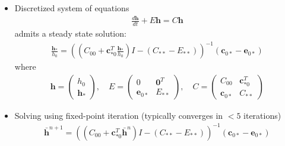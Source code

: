 \documentclass[mathserif, aspectratio=169]{beamer}
\newcommand{\vect}[1]{\boldsymbol{#1}}
\begin{document}
\begin{frame}
\begin{itemize}
\item Discretized system of equations 
\begin{align*}
\frac{d \vect{h}}{dt} + E \vect{h} = C \vect{h}
\end{align*}
admits a steady state solution:
\begin{align*}
\frac{\vect{h}_\ast}{h_0} = 
\left( \left(C_{00} + \vect{c}_{\ast 0}^T \frac{\vect{h}_\ast}{h_0} \right) I
- \left( C_{\ast\ast} - E_{\ast\ast} \right) \right)^{-1}
\left( \vect{c}_{0\ast} - \vect{e}_{0\ast} \right)
\end{align*}
where
\begin{align*}
\vect{h} = 
\begin{pmatrix}
h_0 \\ \vect{h}_\ast
\end{pmatrix}
,\quad
E = 
\begin{pmatrix}
0 & \vect{0}^T \\
\vect{e}_{0\ast} & E_{\ast\ast}
\end{pmatrix}
,\quad
C = 
\begin{pmatrix}
C_{00} & \vect{c}_{\ast 0}^T \\
\vect{c}_{0\ast} & C_{\ast\ast}
\end{pmatrix}
\end{align*}

\item Solving using fixed-point iteration (typically converges in $<5$ iterations)
\begin{align*}
\bar{\vect{h}}^{n+1} = 
\left( \left(C_{00} + \vect{c}_{\ast 0}^T \bar{\vect{h}}^{n} \right) I
- \left( C_{\ast\ast} - E_{\ast\ast} \right) \right)^{-1}
\left( \vect{c}_{0\ast} - \vect{e}_{0\ast} \right)
\end{align*}
\end{itemize}
\end{frame}
\end{document}
